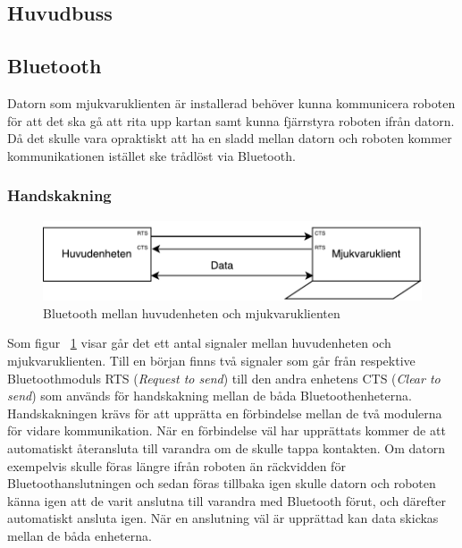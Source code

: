 \documentclass{article}
\begin{document}
\subsection{Huvudbuss}

\subsection{Bluetooth}
Datorn som mjukvaruklienten är installerad behöver kunna kommunicera roboten för att det ska gå att rita upp kartan samt kunna fjärrstyra roboten ifrån datorn. Då det skulle vara opraktiskt att ha en sladd mellan datorn och roboten kommer kommunikationen istället ske trådlöst via Bluetooth. 

\subsubsection{Handskakning}
\begin{figure}[H]
\centering 
\includegraphics[scale=0.8]{Kommunikation_Bluetooth}
\caption{Bluetooth mellan huvudenheten och mjukvaruklienten}
\label{fig:Kommunikation_Bluetooth}
\end{figure}

Som figur ~\ref{fig:Kommunikation_Bluetooth} visar går det ett antal signaler mellan huvudenheten och mjukvaruklienten. Till en början finns två signaler som går från respektive Bluetoothmoduls RTS (\textit{Request to send}) till den andra enhetens CTS (\textit{Clear to send}) som används för handskakning mellan de båda Bluetoothenheterna. Handskakningen krävs för att upprätta en förbindelse mellan de två modulerna för vidare kommunikation. När en förbindelse väl har upprättats kommer de att automatiskt återansluta till varandra om de skulle tappa kontakten. Om datorn exempelvis skulle föras längre ifrån roboten än räckvidden för Bluetoothanslutningen och sedan föras tillbaka igen skulle datorn och roboten känna igen att de varit anslutna till varandra med Bluetooth förut, och därefter automatiskt ansluta igen.
\newline\newline
När en anslutning väl är upprättad kan data skickas mellan de båda enheterna.
\end{document}
